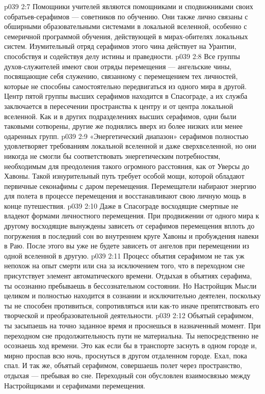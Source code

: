 \vs p039 2:7 \pc {}\bibnobreakspace {} Помощники учителей являются помощниками и сподвижниками своих собратьев\hyp{}серафимов --- советников по обучению. Они также лично связаны с обширными образовательными системами в локальной вселенной, особенно с семеричной программой обучения, действующей в мирах\hyp{}обителях локальных систем. Изумительный отряд серафимов этого чина действует на Урантии, способствуя и содействуя делу истины и праведности.
\vs p039 2:8 \pc {}\bibnobreakspace {} Все группы духов\hyp{}служителей имеют свои отряды перемещения --- ангельские чины, посвящающие себя служению, связанному с перемещением тех личностей, которые не способны самостоятельно передвигаться из одного мира в другой. Центр пятой группы высших серафимов находится в Спасограде, а их служба заключается в пересечении пространства к центру и от центра локальной вселенной. Как и в других подразделениях высших серафимов, одни были таковыми сотворены, другие же поднялись вверх из более низких или менее одаренных групп.
\vs p039 2:9 \pc «Энергетический диапазон» серафимов полностью удовлетворяет требованиям локальной вселенной и даже сверхвселенной, но они никогда не смогли бы соответствовать энергетическим потребностям, необходимым для преодоления такого огромного расстояния, как от Уверсы до Хавоны. Такой изнурительный путь требует особой мощи, которой обладают первичные секонафимы с даром перемещения. Перемещатели набирают энергию для полета в процессе перемещения и восстанавливают свою личную мощь в конце путешествия.
\vs p039 2:10 \pc Даже в Спасограде восходящие смертные не владеют формами личностного перемещения. При продвижении от одного мира к другому восходящие вынуждены зависеть от серафимов перемещения вплоть до погружения в последний сон во внутреннем круге Хавоны и пробуждения навеки в Раю. После этого вы уже не будете зависеть от ангелов при перемещении из одной вселенной в другую.
\vs p039 2:11 Процесс объятия серафимом не так уж непохож на опыт смерти или сна за исключением того, что в переходном сне присутствует элемент автоматического времени. Отдыхая в объятиях серафима, ты осознанно пребываешь в бессознательном состоянии. Но Настройщик Мысли целиком и полностью находится в сознании и исключительно деятелен, поскольку ты не способен противиться, сопротивляться или как\hyp{}то иначе препятствовать его творческой и преобразовательной деятельности.
\vs p039 2:12 Объятый серафимом, ты засыпаешь на точно заданное время и проснешься в назначенный момент. При переходном сне продолжительность пути не материальна. Ты непосредственно не осознаешь ход времени. Это как если бы в транспорте заснуть в одном городе и, мирно проспав всю ночь, проснуться в другом отдаленном городе. Ехал, пока спал. И так же, объятый серафимом, совершаешь полет через пространство, отдыхая --- пребывая во сне. Переходный сон обусловлен взаимосвязью между Настройщиками и серафимами перемещения.
